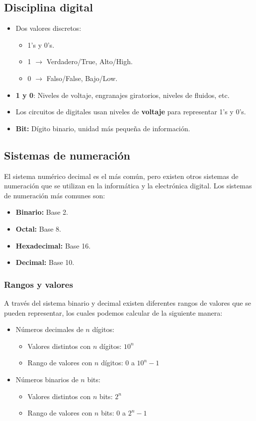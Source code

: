 \documentclass{templateNote}
\begin{document}
\subsection{Disciplina digital}
\begin{itemize}
    \item Dos valores discretos:
    \begin{itemize}
        \item 1's y 0's.
        \item 1 $\rightarrow$ Verdadero/True, Alto/High.   
        \item 0 $\rightarrow$ Falso/False, Bajo/Low. 
    \end{itemize}
    \item \textbf{1 y 0}: Niveles de voltaje, engranajes giratorios, niveles de fluidos, etc.
    \item Los circuitos de digitales usan niveles de \textbf{voltaje} para representar 1's y 0's.
    \item \textbf{Bit:} Dígito binario, unidad más pequeña de información.
\end{itemize}

\subsection{Sistemas de numeración}
\noindent El sistema numérico decimal es el más común, pero existen otros sistemas de numeración que se utilizan en la informática y la electrónica digital. Los sistemas de numeración más comunes son:
\begin{itemize}
    \item \textbf{Binario:} Base 2.
    \item \textbf{Octal:} Base 8.
    \item \textbf{Hexadecimal:} Base 16.
    \item \textbf{Decimal:} Base 10.
\end{itemize}

\subsubsection{Rangos y valores}
\noindent A través del sistema binario y decimal existen diferentes rangos de valores que se pueden representar, los cuales podemos calcular de la siguiente manera:
\begin{itemize}
    \item Números decimales de $n$ dígitos:
    \begin{itemize}
        \item Valores distintos con $n$ dígitos: $10^n$
        \item Rango de valores con $n$ dígitos: $0$ a $10^n - 1$ 
    \end{itemize}
    \item Números binarios de $n$ bits:
    \begin{itemize}
        \item Valores distintos con $n$ bits: $2^n$
        \item Rango de valores con $n$ bits: $0$ a $2^n - 1$
    \end{itemize}   
\end{itemize}
\end{document}
